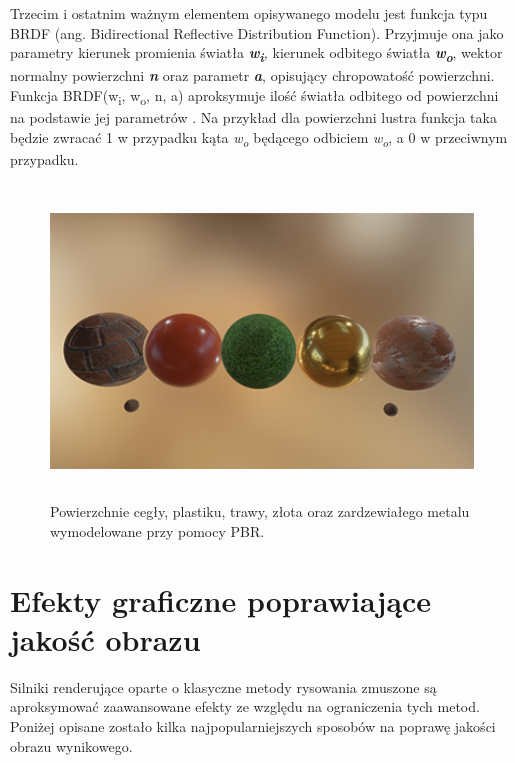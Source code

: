 \begin{itemize}
	Trzecim i ostatnim ważnym elementem opisywanego modelu jest funkcja typu BRDF (ang. Bidirectional Reflective Distribution Function). Przyjmuje ona jako parametry kierunek promienia światła \emph{\textbf{w\textsubscript{i}},} kierunek odbitego światła \emph{\textbf{w\textsubscript{o}}}, wektor normalny powierzchni \emph{\textbf{n}} oraz parametr \emph{\textbf{a}}, opisujący chropowatość powierzchni. Funkcja BRDF(w\textsubscript{i}, w\textsubscript{o}, n, a) aproksymuje ilość światła odbitego od powierzchni na podstawie jej parametrów \cite{learnopengl:pbr:2024}. Na przykład dla powierzchni lustra funkcja taka będzie zwracać 1 w przypadku kąta \emph{w\textsubscript{o}} będącego odbiciem \emph{w\textsubscript{o}}, a 0 w przeciwnym przypadku.
	
	\begin{figure}[htbp]
		\centering
		\includegraphics[width=5.425in,height=3.2752in]{images/8_pbr_surfaces.png}
		\caption{Powierzchnie cegły, plastiku, trawy, złota oraz zardzewiałego metalu wymodelowane przy pomocy PBR. \cite{learnopengl:pbr:2024}}
	\end{figure}
\end{itemize}

\section{Efekty graficzne poprawiające jakość obrazu}

Silniki renderujące oparte o klasyczne metody rysowania zmuszone są aproksymować zaawansowane efekty ze względu na ograniczenia tych metod. Poniżej opisane zostało kilka najpopularniejszych sposobów na poprawę jakości obrazu wynikowego.


